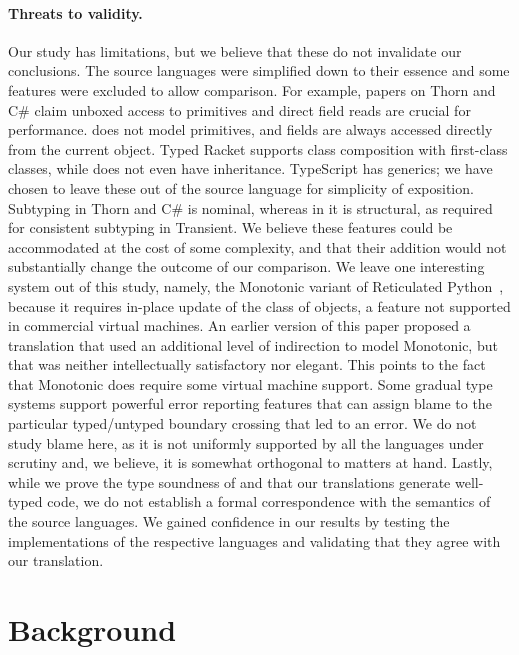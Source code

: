 \documentclass[acmlarge, anonymous, authordraft, review]{acmart} %
\begin{document}
\paragraph{Threats to validity.} Our study has limitations, but we believe
that these do not invalidate our conclusions. The source languages were
simplified down to their essence and some features were excluded to allow
comparison.  For example, papers on Thorn and C\# claim unboxed access to
primitives and direct field reads are crucial for performance. \kafka does
not model primitives, and fields are always accessed directly from the
current object. Typed Racket supports class composition with first-class
classes, while \kafka does not even have inheritance. TypeScript has
generics; we have chosen to leave these out of the source language for
simplicity of exposition. Subtyping in Thorn and C\# is nominal, whereas in
\kafka it is structural, as required for consistent subtyping in
Transient.  We believe these features could be accommodated at the cost of
some complexity, and that their addition would not substantially change the
outcome of our comparison. We leave one interesting system out of this
study, namely, the Monotonic variant of Reticulated Python~\cite{siek14},
because it requires in-place update of the class of objects, a
feature not supported in commercial virtual machines. An earlier version of this
paper proposed a translation that used an additional level of indirection to
model Monotonic, but that was neither intellectually satisfactory nor
elegant.  This points to the fact that Monotonic does require some virtual
machine support.  Some gradual type systems support powerful error reporting
features that can assign blame to the particular typed/untyped boundary
crossing that led to an error. We do not study blame here, as it is not
uniformly supported by all the languages under scrutiny and, we believe, it
is somewhat orthogonal to matters at hand.  Lastly, while we prove the type
soundness of \kafka and that our translations generate well-typed code, we
do not establish a formal correspondence with the semantics of the source
languages. We gained confidence in our results by testing the
implementations of the respective languages and validating that they agree
with our translation.

\medskip

\section{Background}
\end{document}

